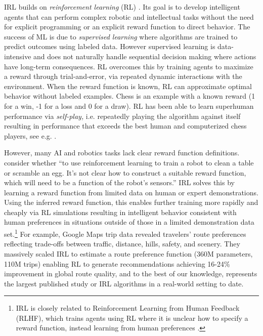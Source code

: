 IRL \citep{ng:2000} builds on {\it reinforcement learning\/} (RL) \citep{BartoSutton:1998}. Its goal is to develop intelligent agents that can perform complex robotic and intellectual tasks without
the need for explicit programming or an explicit reward function to direct behavior. The success of ML 
is due to {\it supervised learning\/} where algorithms are trained to predict outcomes using labeled data. 
However supervised learning is data-intensive and does not naturally handle sequential decision making 
where actions have long-term consequences. RL overcomes this by training agents to maximize a reward through trial-and-error,
via repeated dynamic interactions with the environment. 
When the reward function is known, RL can  approximate optimal behavior without labeled examples. Chess is an example with a known reward (1 for a win, -1 for a loss and 0 for a draw). RL has been able to learn superhuman performance via {\it self-play,\/} i.e. repeatedly playing the algorithm against itself resulting in performance that exceeds the best human and computerized chess players, see e.g. \citet{Silver:2018}.

However, many AI and robotics tasks lack clear reward function definitions. \citet{christiano:2017} consider whether  ``to use reinforcement learning to train a robot to clean a table or scramble an egg. It's not clear how to construct a suitable reward function, which will need to be a function of the robot's sensors.''  
IRL solves this by learning a reward function from limited data on human or expert demonstrations. Using the inferred reward function, 
this enables further training more rapidly and cheaply via RL simulations resulting in
 intelligent behavior consistent with human preferences in situations outside of those in a limited demonstration
data set.\footnote{\footnotesize
IRL is closely related to Reinforcement Learning from Human Feedback (RLHF),
which trains agents using RL where it is unclear how to
specify a reward function, instead learning from human preferences \citep{christiano:2017}.}
For example, Google Maps trip data \citep{Barnes:2024} revealed travelers' route preferences reflecting trade-offs between traffic, distance, hills, safety, and scenery. They massively scaled IRL to estimate a route preference function (360M parameters, 110M trips) enabling RL to generate recommendations achieving 16-24\% improvement in global route quality, and to the best of our knowledge, represents the largest published study or IRL algorithms in a real-world setting to date.

